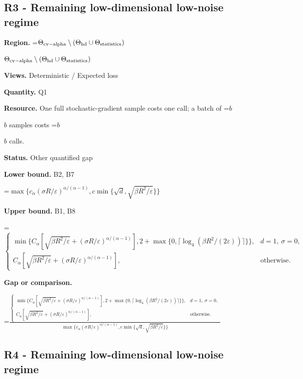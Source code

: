 \documentclass[10pt,a4paper]{article}
\newcommand{\AtlasMath}[1]{\par\begingroup\centering\setbox0=\hbox{$\displaystyle #1$}\ifdim\wd0>1.4\linewidth\typeout{ATLAS WIDE FORMULA: \the\wd0}\fi\ifdim\wd0>\linewidth\resizebox{\linewidth}{!}{\box0}\else\box0\fi\par\endgroup}
\newcommand{\AtlasInlineMath}[1]{\begingroup\setbox0=\hbox{$#1$}\ifdim\wd0>.4\linewidth\endgroup\AtlasMath{#1}\else\endgroup$#1$\fi}
\begin{document}
\subsection{R3 - Remaining low-dimensional low-noise regime}


\textbf{Region.} \AtlasInlineMath{\Theta_{\rm cv-alpha}\setminus(\Theta_{\rm hd}\cup\Theta_{\rm statistics})}



\textbf{Views.} Deterministic / Expected loss



\textbf{Quantity.} Q1



\textbf{Resource.} One full stochastic-gradient sample costs one call; a batch of \AtlasInlineMath{b} samples costs \AtlasInlineMath{b} calls.



\textbf{Status.} Other quantified gap



\textbf{Lower bound.} B2, B7



\AtlasMath{\max\{c_\alpha (\sigma R/\varepsilon)^{\alpha/(\alpha-1)},c\min\{\sqrt d,\sqrt{\beta R^2/\varepsilon}\}\}}


\textbf{Upper bound.} B1, B8



\AtlasMath{\begin{cases}\min\{C_\alpha[\sqrt{\beta R^2/\varepsilon}+(\sigma R/\varepsilon)^{\alpha/(\alpha-1)}],2+\max\{0,\lceil\log_4(\beta R^2/(2\varepsilon))\rceil\}\},&d=1,\ \sigma=0,\\C_\alpha[\sqrt{\beta R^2/\varepsilon}+(\sigma R/\varepsilon)^{\alpha/(\alpha-1)}],&\text{otherwise}.\end{cases}}


\textbf{Gap or comparison.}
\AtlasMath{\frac{\begin{cases}\min\{C_\alpha[\sqrt{\beta R^2/\varepsilon}+(\sigma R/\varepsilon)^{\alpha/(\alpha-1)}],2+\max\{0,\lceil\log_4(\beta R^2/(2\varepsilon))\rceil\}\},&d=1,\ \sigma=0,\\C_\alpha[\sqrt{\beta R^2/\varepsilon}+(\sigma R/\varepsilon)^{\alpha/(\alpha-1)}],&\text{otherwise}.\end{cases}}{\max\{c_\alpha (\sigma R/\varepsilon)^{\alpha/(\alpha-1)},c\min\{\sqrt d,\sqrt{\beta R^2/\varepsilon}\}\}}}




\subsection{R4 - Remaining low-dimensional low-noise regime}
\end{document}
